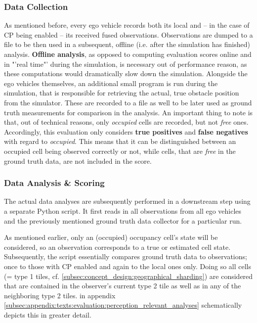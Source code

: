 \subsubsection{Data Collection}
As mentioned before, every ego vehicle records both its local and – in the case of CP being enabled – its received fused observations. Observations are dumped to a file to be then used in a subsequent, offline (i.e. after the simulation has finished) analysis. \textbf{Offline analysis}, as opposed to computing evaluation scores online and in "'real time"' during the simulation, is necessary out of performance reason, as these computations would dramatically slow down the simulation. Alongside the ego vehicles themselves, an additional small program is run during the simulation, that is responsible for retrieving the actual, true obstacle position from the simulator. These are recorded to a file as well to be later used as ground truth measurements for comparison in the analysis. An important thing to note is that, out of technical reasons, only \textit{occupied} cells are recorded, but not \textit{free} ones. Accordingly, this evaluation only considers \textbf{true positives} and \textbf{false negatives} with regard to \textit{occupied}. This means that it can be distinguished between an occupied cell being observed correctly or not, while cells, that are \textit{free} in the ground truth data, are not included in the score.
\par
\bigskip

\subsubsection{Data Analysis \& Scoring}
The actual data analyses are subsequently performed in a downstream step using a separate Python script. It first reads in all observations from all ego vehicles and the previously mentioned ground truth data collector for a particular run.

As mentioned earlier, only an (occupied) occupancy cell's state will be considered, so an observation corresponds to a true or estimated cell state. Subsequently, the script essentially compares ground truth data to observations; once to those with CP enabled and again to the local ones only. Doing so all cells (= type 1 tiles, cf. \cref{subsec:concept_design:geographical_sharding}) are considered that are contained in the observer's current type 2 tile as well as in any of the neighboring type 2 tiles.  in appendix \cref{subsec:appendix:texts:evaluation:perception_relevant_analyses} schematically depicts this in greater detail.

